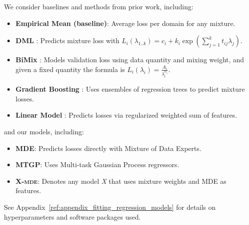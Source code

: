 
\noindent
We consider baselines and methods from prior work, including:

\begin{itemize}[leftmargin=*, itemsep=2pt, parsep=0pt, topsep=0pt]
    \item \textbf{Empirical Mean (baseline)}: Average loss per domain for any mixture.
    \item \textbf{DML} \cite{dml}: Predicts mixture loss with $L_i(\lambda_{1..k}) = c_i + k_i \exp (\sum_{j=1}^k t_{ij}\lambda_j)$.
    \item \textbf{BiMix} \cite{bimix}: Models validation loss using data quantity and mixing weight, and given a fixed quantity the formula is $L_i(\lambda_i) = \frac{A_i}{\lambda_i^{\alpha_i}}$.
    \item \textbf{Gradient Boosting} \cite[GBM-RegMix;][]{regmix}: Uses ensembles of regression trees to predict mixture losses.
    \item \textbf{Linear Model} \cite{regmix}: Predicts losses via regularized weighted sum of features.
\end{itemize}

\noindent
and our models, including:

\begin{itemize}[leftmargin=*, itemsep=2pt, parsep=0pt, topsep=0pt]
    \item \textbf{MDE}: Predicts losses directly with Mixture of Data Experts.
    \item \textbf{MTGP}: Uses Multi-task Gaussian Process regressors.
    \item \textbf{X-\textsc{mde}}: Denotes any model \textit{X} that uses mixture weights and MDE as features.
\end{itemize}


See Appendix~\ref{ref:appendix_fitting_regression_models} for details on hyperparameters and software packages used.